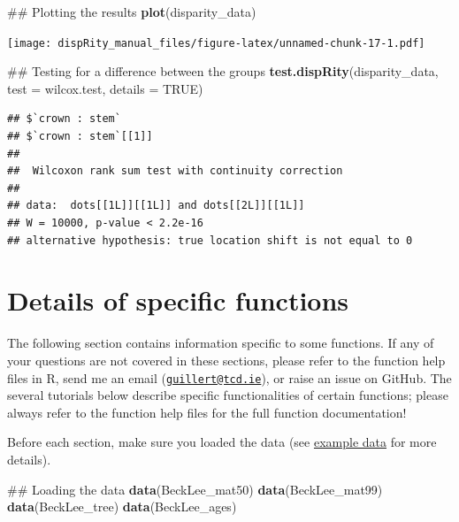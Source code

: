 \documentclass[]{book}
\newenvironment{Shaded}{\begin{snugshade}}{\end{snugshade}}
\newcommand{\KeywordTok}[1]{\textcolor[rgb]{0.13,0.29,0.53}{\textbf{#1}}}
\newcommand{\DataTypeTok}[1]{\textcolor[rgb]{0.13,0.29,0.53}{#1}}
\newcommand{\OtherTok}[1]{\textcolor[rgb]{0.56,0.35,0.01}{#1}}
\newcommand{\NormalTok}[1]{#1}
\theoremstyle{definition}
\theoremstyle{definition}
\theoremstyle{remark}
\begin{document}
\begin{Shaded}
\begin{Highlighting}[]
\NormalTok{## Plotting the results}
\KeywordTok{plot}\NormalTok{(disparity_data)}
\end{Highlighting}
\end{Shaded}

\texttt{[image: dispRity\_manual\_files/figure-latex/unnamed-chunk-17-1.pdf]}

\begin{Shaded}
\begin{Highlighting}[]
\NormalTok{## Testing for a difference between the groups}
\KeywordTok{test.dispRity}\NormalTok{(disparity_data, }\DataTypeTok{test =}\NormalTok{ wilcox.test, }\DataTypeTok{details =} \OtherTok{TRUE}\NormalTok{)}
\end{Highlighting}
\end{Shaded}

\begin{verbatim}
## $`crown : stem`
## $`crown : stem`[[1]]
## 
##  Wilcoxon rank sum test with continuity correction
## 
## data:  dots[[1L]][[1L]] and dots[[2L]][[1L]]
## W = 10000, p-value < 2.2e-16
## alternative hypothesis: true location shift is not equal to 0
\end{verbatim}

\chapter{Details of specific
functions}\label{details-of-specific-functions}

The following section contains information specific to some functions.
If any of your questions are not covered in these sections, please refer
to the function help files in R, send me an email
(\href{mailto:guillert@tcd.ie}{\nolinkurl{guillert@tcd.ie}}), or raise
an issue on GitHub. The several tutorials below describe specific
functionalities of certain functions; please always refer to the
function help files for the full function documentation!

Before each section, make sure you loaded the \citet{beckancient2014}
data (see \protect\hyperlink{example-data}{example data} for more
details).

\begin{Shaded}
\begin{Highlighting}[]
\NormalTok{## Loading the data}
\KeywordTok{data}\NormalTok{(BeckLee_mat50)}
\KeywordTok{data}\NormalTok{(BeckLee_mat99)}
\KeywordTok{data}\NormalTok{(BeckLee_tree)}
\KeywordTok{data}\NormalTok{(BeckLee_ages)}
\end{Highlighting}
\end{Shaded}
\end{document}
